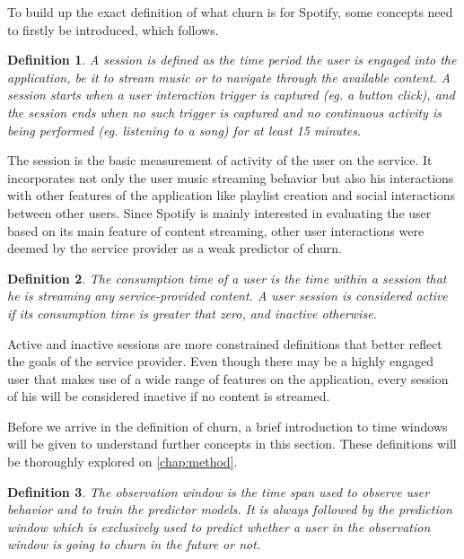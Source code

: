 \documentclass{kththesis}
\begin{document}
To build up the exact definition of what churn is for Spotify, some concepts need to firstly be introduced, which follows.

\newtheorem{definition}{Definition}

\begin{definition}
A \emph{session} is defined as the time period the user is engaged into the application, be it to stream music or to navigate through the available content. A session starts when a user interaction trigger is captured (eg. a button click), and the session ends when no such trigger is captured and no continuous activity is being performed (eg. listening to a song) for at least 15 minutes.
\end{definition}

The session is the basic measurement of activity of the user on the service. It incorporates not only the user music streaming behavior but also his interactions with other features of the application like playlist creation and social interactions between other users. Since Spotify is mainly interested in evaluating the user based on its main feature of content streaming, other user interactions were deemed by the service provider as a weak predictor of churn. 

\begin{definition}
The \emph{consumption time} of a user is the time within a session that he is streaming any service-provided content. A user session is considered \emph{active} if its consumption time is greater that zero, and \emph{inactive} otherwise.
\end{definition}

Active and inactive sessions are more constrained definitions that better reflect the goals of the service provider. Even though there may be a highly engaged user that makes use of a wide range of features on the application, every session of his will be considered inactive if no content is streamed.

Before we arrive in the definition of churn, a brief introduction to time windows will be given to understand further concepts in this section. These definitions will be thoroughly explored on \autoref{chap:method}.

\begin{definition}
The \emph{observation window} is the time span used to observe user behavior and to train the predictor models. It is always followed by the \emph{prediction window} which is exclusively used to predict whether a user in the observation window is going to churn in the future or not. 
\end{definition}
\end{document}
